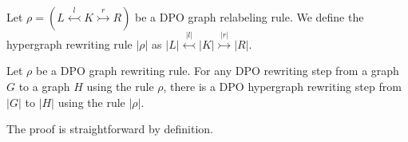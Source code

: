 \begin{definition}
    Let $\rho \mathop{=} (L \overset{l}{\leftarrowtail} K \overset{r}{\rightarrowtail} R)$ be a DPO graph relabeling rule. We define the hypergraph rewriting rule $|\rho|$ as $|L| \overset{|l|}{\leftarrowtail} |K| \overset{|r|}{\rightarrowtail} |R|$. 
\end{definition}


\begin{theorem}
    Let $\rho$ be a DPO graph rewriting rule.
    For any DPO rewriting step from a graph $G$ to a graph $H$ using the rule $\rho$, there is a DPO hypergraph rewriting step from $|G|$ to $|H|$ using the rule $|\rho|$.
\end{theorem}
The proof is straightforward by definition.